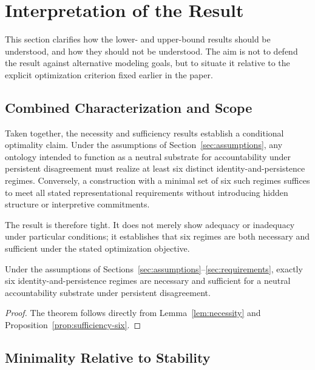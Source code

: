\section{Interpretation of the Result}
\label{sec:interpretation}

This section clarifies how the lower- and upper-bound results should be
understood, and how they should not be understood.
The aim is not to defend the result against alternative modeling goals,
but to situate it relative to the explicit optimization criterion fixed
earlier in the paper.

\subsection{Combined Characterization and Scope}

Taken together, the necessity and sufficiency results establish a
conditional optimality claim.
Under the assumptions of Section~\ref{sec:assumptions},
any ontology intended to function as a neutral substrate
for accountability under persistent disagreement
must realize at least six distinct identity-and-persistence regimes.
Conversely, a construction with a minimal set of six such regimes suffices to meet
all stated representational requirements without introducing hidden
structure or interpretive commitments.

The result is therefore tight.
It does not merely show adequacy or inadequacy
under particular conditions;
it establishes that six regimes are both necessary and sufficient
under the stated optimization objective.

\medskip
\begin{theorem}
\label{thm:tightness}
Under the assumptions of Sections~\ref{sec:assumptions}--\ref{sec:requirements},
exactly six identity-and-persistence regimes are necessary and sufficient
for a neutral accountability substrate under persistent disagreement.
\end{theorem}
\begin{proof}
The theorem follows directly from Lemma~\ref{lem:necessity}
and Proposition~\ref{prop:sufficiency-six}.
\end{proof}

\subsection{Minimality Relative to Stability}

